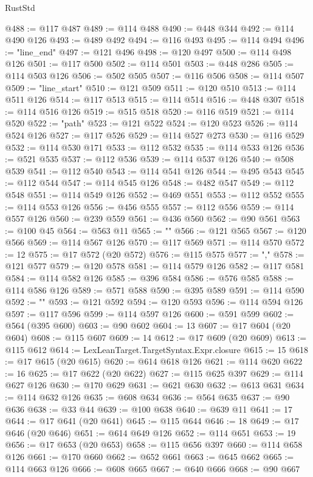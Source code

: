 \begin{lexlean}{RustStd}
\begin{coremodule}
{\begin{coremodule}
{{{{{{{{{{{{{{{{{{{{{{{{{{{{{{{{{{{{{{{{{{{{{{{{{{@488 := @117 @487
@489 := @114 @488
@490 := @448 @344
@492 := @114 @490 @126
@493 := @489 @492
@494 := @116 @493
@495 := @114 @494
@496 := "line_end"
@497 := @121 @496
@498 := @120 @497
@500 := @114 @498 @126
@501 := @117 @500
@502 := @114 @501
@503 := @448 @286
@505 := @114 @503 @126
@506 := @502 @505
@507 := @116 @506
@508 := @114 @507
@509 := "line_start"
@510 := @121 @509
@511 := @120 @510
@513 := @114 @511 @126
@514 := @117 @513
@515 := @114 @514
@516 := @448 @307
@518 := @114 @516 @126
@519 := @515 @518
@520 := @116 @519
@521 := @114 @520
@522 := "path"
@523 := @121 @522
@524 := @120 @523
@526 := @114 @524 @126
@527 := @117 @526
@529 := @114 @527 @273
@530 := @116 @529
@532 := @114 @530 @171
@533 := @112 @532
@535 := @114 @533 @126
@536 := @521 @535
@537 := @112 @536
@539 := @114 @537 @126
@540 := @508 @539
@541 := @112 @540
@543 := @114 @541 @126
@544 := @495 @543
@545 := @112 @544
@547 := @114 @545 @126
@548 := @482 @547
@549 := @112 @548
@551 := @114 @549 @126
@552 := @469 @551
@553 := @112 @552
@555 := @114 @553 @126
@556 := @456 @555
@557 := @112 @556
@559 := @114 @557 @126
@560 := @239 @559
@561 := @436 @560
@562 := @90 @561
@563 := @100 @45
@564 := @563 @11
@565 := "{"
@566 := @121 @565
@567 := @120 @566
@569 := @114 @567 @126
@570 := @117 @569
@571 := @114 @570
@572 := 12
@575 := @17 @572 (@20 @572)
@576 := @115 @575
@577 := ","
@578 := @121 @577
@579 := @120 @578
@581 := @114 @579 @126
@582 := @117 @581
@584 := @114 @582 @126
@585 := @396 @584
@586 := @576 @585
@588 := @114 @586 @126
@589 := @571 @588
@590 := @395 @589
@591 := @114 @590
@592 := "}"
@593 := @121 @592
@594 := @120 @593
@596 := @114 @594 @126
@597 := @117 @596
@599 := @114 @597 @126
@600 := @591 @599
@602 := @564 (@395 @600)
@603 := @90 @602
@604 := 13
@607 := @17 @604 (@20 @604)
@608 := @115 @607
@609 := 14
@612 := @17 @609 (@20 @609)
@613 := @115 @612
@614 := LexLeanTarget.TargetSyntax.Expr.closure
@615 := 15
@618 := @17 @615 (@20 @615)
@620 := @614 @618 @126
@621 := @114 @620
@622 := 16
@625 := @17 @622 (@20 @622)
@627 := @115 @625 @397
@629 := @114 @627 @126
@630 := @170 @629
@631 := @621 @630
@632 := @613 @631
@634 := @114 @632 @126
@635 := @608 @634
@636 := @564 @635
@637 := @90 @636
@638 := @33 @44
@639 := @100 @638
@640 := @639 @11
@641 := 17
@644 := @17 @641 (@20 @641)
@645 := @115 @644
@646 := 18
@649 := @17 @646 (@20 @646)
@651 := @614 @649 @126
@652 := @114 @651
@653 := 19
@656 := @17 @653 (@20 @653)
@658 := @115 @656 @397
@660 := @114 @658 @126
@661 := @170 @660
@662 := @652 @661
@663 := @645 @662
@665 := @114 @663 @126
@666 := @608 @665
@667 := @640 @666
@668 := @90 @667
}}}}}}}}}}}}}}}}}}}}}}}}}}}}}}}}}}}}}}}}}}}}}}}}}}
\end{coremodule}}
\end{coremodule}
\end{lexlean}
